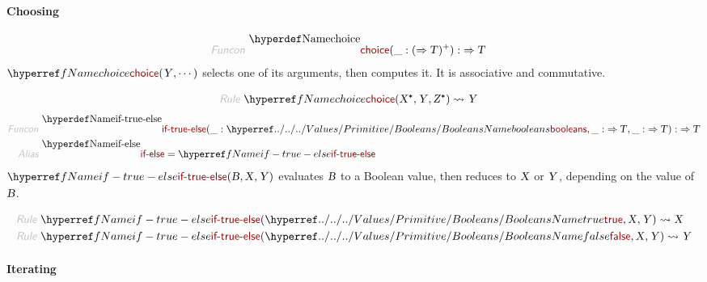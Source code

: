 \paragraph*{Choosing}\hypertarget{choosing}{}\label{choosing}

\begin{align*}
  \KEY{Funcon} ~ 
  & \NAMEDECL{choice}(\_ : (  \TO \VAR{T} )\PLUS) :  \TO \VAR{T}
\end{align*}
$\SHADE{\NAMEREF{choice}
           ( \VAR{Y},   
             \cdots )}$ selects one of its arguments, then computes it.
  It is associative and commutative.

\begin{align*}
  \KEY{Rule} ~ 
    & \NAMEREF{choice}
        ( \VAR{X}\STAR,   
          \VAR{Y},   
          \VAR{Z}\STAR ) \leadsto
        \VAR{Y}
\end{align*}
\begin{align*}
  \KEY{Funcon} ~ 
  & \NAMEDECL{if-true-else}(\_ : \NAMEHYPER{../../../Values/Primitive}{Booleans}{booleans}, \_ :  \TO \VAR{T}, \_ :  \TO \VAR{T}) :  \TO \VAR{T}
\\
  \KEY{Alias} ~ 
  & \NAMEDECL{if-else} = \NAMEREF{if-true-else}
\end{align*}
$\SHADE{\NAMEREF{if-true-else}
           ( \VAR{B},   
             \VAR{X},   
             \VAR{Y} )}$ evaluates $\SHADE{\VAR{B}}$ to a Boolean value, then reduces
  to $\SHADE{\VAR{X}}$ or $\SHADE{\VAR{Y}}$, depending on the value of $\SHADE{\VAR{B}}$.

\begin{align*}
  \KEY{Rule} ~ 
    & \NAMEREF{if-true-else}
        ( \NAMEHYPER{../../../Values/Primitive}{Booleans}{true},   
          \VAR{X},   
          \VAR{Y} ) \leadsto
        \VAR{X}
\\
  \KEY{Rule} ~ 
    & \NAMEREF{if-true-else}
        ( \NAMEHYPER{../../../Values/Primitive}{Booleans}{false},   
          \VAR{X},   
          \VAR{Y} ) \leadsto
        \VAR{Y}
\end{align*}
\paragraph*{Iterating}\hypertarget{iterating}{}\label{iterating}


